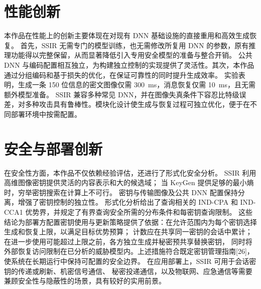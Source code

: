 \documentclass[UTF8,a4paper,zihao=-4,fontset=windows,openany]{ctexbook}
\begin{document}
\section{性能创新}
本作品在性能上的创新主要体现在对现有 DNN 基础设施的直接重用和高效生成恢复。
首先，SSIR 无需专门的模型训练，也无需修改所复用 DNN 的参数，原有推理功能得以完整保留，从而显著降低引入专用安全模型的准备与整合开销。
公共 DNN 与编码配置相互独立，为构建独立控制的实现提供了灵活性。其次，本作品通过分组编码和基于损失的优化，在保证可靠性的同时提升生成效率。
实验表明，生成一条 150 位信息的密文图像仅需 300~ms，消息恢复仅需 10~ms，且无需额外模型准备。
SSIR 兼容多种常见 DNN，并在图像失真条件下容忍比特级误差，对多种攻击具有鲁棒性。模块化设计使生成与恢复过程可独立优化，便于在不同部署环境中按需配置。

\section{安全与部署创新}
在安全性方面，本作品不仅依赖经验评估，还进行了形式化安全分析。
SSIR 利用高维图像密钥提供灵活的内容表示和大的候选域；
当 KeyGen 提供足够的最小熵时，穷举密钥搜索在计算上不可行。
密钥与传输图像及公共 DNN 配置保持分离，增强了密钥控制的独立性。
形式化分析给出了查询相关的 IND-CPA 和 IND-CCA1 优势界，并规定了有界查询安全所需的分布条件和每密钥查询限制。
这些结论为部署方配置密钥使用与更新策略提供了依据：在允许范围内为每个密钥选择生成和恢复上限，以满足目标优势预算；
计数应在共享同一密钥的会话中累计；在进一步使用可能超过上限之前，各方独立生成并秘密预共享替换密钥，
同时将外部恢复访问限制在已分析的威胁模型内。上述措施符合既定密钥管理指南[26]，使系统在长期运行中保持可配置的安全边界。
在应用部署上，SSIR 可用于会话密钥的传递或刷新、机密信号通信、
秘密投递通信，以及物联网、应急通信等需要兼顾安全性与隐蔽性的场景，具有较好的实用前景。
\end{document}
